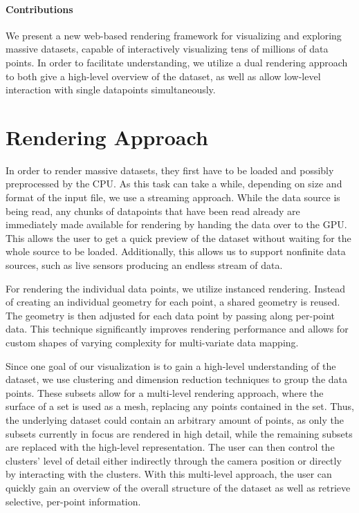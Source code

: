 \documentclass[sigconf]{acmart}
\begin{document}
\paragraph{Contributions}
We present a new web-based rendering framework for visualizing and exploring massive datasets, capable of interactively visualizing tens of millions of data points. In order to facilitate understanding, we utilize a dual rendering approach to both give a high-level overview of the dataset, as well as allow low-level interaction with single datapoints simultaneously.

\section{Rendering Approach}

In order to render massive datasets, they first have to be loaded and possibly preprocessed by the CPU. As this task can take a while, depending on size and format of the input file, we use a streaming approach. While the data source is being read, any chunks of datapoints that have been read already are immediately made available for rendering by handing the data over to the GPU. This allows the user to get a quick preview of the dataset without waiting for the whole source to be loaded. Additionally, this allows us to support nonfinite data sources, such as live sensors producing an endless stream of data.

For rendering the individual data points, we utilize instanced rendering.
Instead of creating an individual geometry for each point, a shared geometry is reused.
The geometry is then adjusted for each data point by passing along per-point data.
This technique significantly improves rendering performance and allows for custom shapes of varying complexity for multi-variate data mapping.

Since one goal of our visualization is to gain a high-level understanding of the dataset, we use clustering and dimension reduction techniques to group the data points.
These subsets allow for a multi-level rendering approach, where the surface of a set is used as a mesh, replacing any points contained in the set.
Thus, the underlying dataset could contain an arbitrary amount of points, as only the subsets currently in focus are rendered in high detail, while the remaining subsets are replaced with the high-level representation.
The user can then control the clusters' level of detail either indirectly through the camera position or directly by interacting with the clusters.
With this multi-level approach, the user can quickly gain an overview of the overall structure of the dataset as well as retrieve selective, per-point information.
\end{document}
